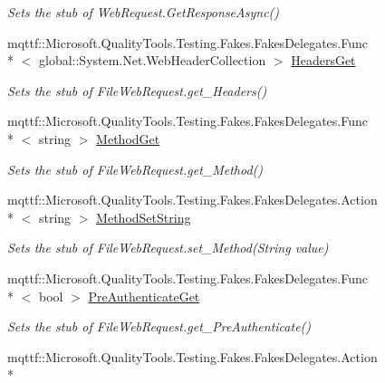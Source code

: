 \begin{DoxyCompactItemize}
\begin{DoxyCompactList}\small\item\em Sets the stub of Web\-Request.\-Get\-Response\-Async()\end{DoxyCompactList}\item 
mqttf\-::\-Microsoft.\-Quality\-Tools.\-Testing.\-Fakes.\-Fakes\-Delegates.\-Func\\*
$<$ global\-::\-System.\-Net.\-Web\-Header\-Collection $>$ \hyperlink{class_system_1_1_net_1_1_fakes_1_1_stub_file_web_request_a691a711fabba0ce0dfa0aac2248b3359}{Headers\-Get}
\begin{DoxyCompactList}\small\item\em Sets the stub of File\-Web\-Request.\-get\-\_\-\-Headers()\end{DoxyCompactList}\item 
mqttf\-::\-Microsoft.\-Quality\-Tools.\-Testing.\-Fakes.\-Fakes\-Delegates.\-Func\\*
$<$ string $>$ \hyperlink{class_system_1_1_net_1_1_fakes_1_1_stub_file_web_request_a4ddb19151e6048958269631b13769781}{Method\-Get}
\begin{DoxyCompactList}\small\item\em Sets the stub of File\-Web\-Request.\-get\-\_\-\-Method()\end{DoxyCompactList}\item 
mqttf\-::\-Microsoft.\-Quality\-Tools.\-Testing.\-Fakes.\-Fakes\-Delegates.\-Action\\*
$<$ string $>$ \hyperlink{class_system_1_1_net_1_1_fakes_1_1_stub_file_web_request_a4f97e7ce92a357c9c9814a0f91b50cfd}{Method\-Set\-String}
\begin{DoxyCompactList}\small\item\em Sets the stub of File\-Web\-Request.\-set\-\_\-\-Method(\-String value)\end{DoxyCompactList}\item 
mqttf\-::\-Microsoft.\-Quality\-Tools.\-Testing.\-Fakes.\-Fakes\-Delegates.\-Func\\*
$<$ bool $>$ \hyperlink{class_system_1_1_net_1_1_fakes_1_1_stub_file_web_request_a4103e387ddeb7cc4ea9400a70fa5d013}{Pre\-Authenticate\-Get}
\begin{DoxyCompactList}\small\item\em Sets the stub of File\-Web\-Request.\-get\-\_\-\-Pre\-Authenticate()\end{DoxyCompactList}\item 
mqttf\-::\-Microsoft.\-Quality\-Tools.\-Testing.\-Fakes.\-Fakes\-Delegates.\-Action\\*

\end{DoxyCompactItemize}
